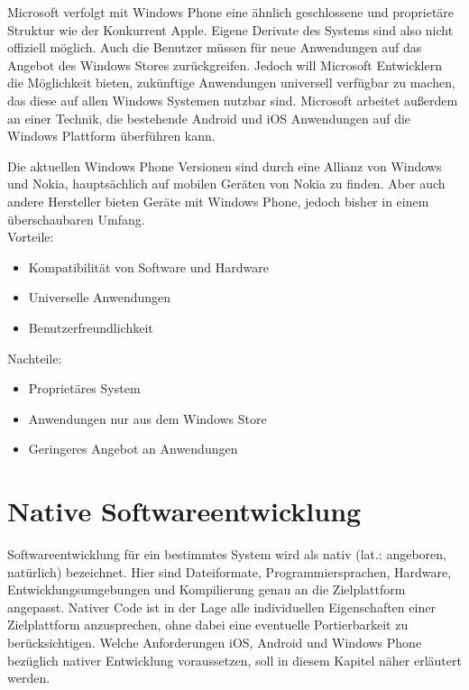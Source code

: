 Microsoft verfolgt mit Windows Phone eine ähnlich geschlossene und proprietäre Struktur wie der Konkurrent Apple. Eigene Derivate des Systems sind also nicht offiziell möglich. Auch die Benutzer müssen für neue Anwendungen auf das Angebot des Windows Stores zurückgreifen. Jedoch will Microsoft Entwicklern die Möglichkeit bieten, zukünftige Anwendungen universell verfügbar zu machen, das diese auf allen Windows Systemen nutzbar sind. Microsoft arbeitet außerdem an einer Technik, die bestehende Android und iOS Anwendungen auf die Windows Plattform überführen kann. \citep{wp_with_android_ios}

Die aktuellen Windows Phone Versionen sind durch eine Allianz von Windows und Nokia, hauptsächlich auf mobilen Geräten von Nokia zu finden.\citep{microsoft_nokia}
Aber auch andere Hersteller bieten Geräte mit Windows Phone, jedoch bisher in einem überschaubaren Umfang.
\\

Vorteile:
\begin{itemize}
	\item Kompatibilität von Software und Hardware
	\item Universelle Anwendungen
	\item Benutzerfreundlichkeit
\end{itemize}

Nachteile:
\begin{itemize}
	\item Proprietäres System
	\item Anwendungen nur aus dem Windows Store
	\item Geringeres Angebot an Anwendungen
\end{itemize}
\citep{wp_pros_cons}


\chapter{Native Softwareentwicklung}
Softwareentwicklung für ein bestimmtes System wird als nativ (lat.: angeboren, natürlich) bezeichnet. Hier sind Dateiformate, Programmiersprachen, Hardware, Entwicklungsumgebungen und Kompilierung genau an die Zielplattform angepasst. Nativer Code ist in der Lage alle individuellen Eigenschaften einer Zielplattform anzusprechen, ohne dabei eine eventuelle Portierbarkeit zu berücksichtigen.
\citep{native_software}
Welche Anforderungen iOS, Android und Windows Phone bezüglich nativer Entwicklung voraussetzen, soll in diesem Kapitel näher erläutert werden.

